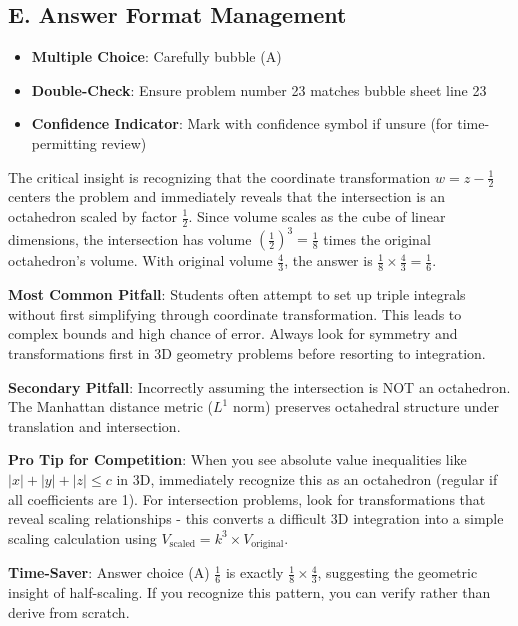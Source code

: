 \documentclass[11pt]{article}
\begin{document}
\begin{competitionbox}
\subsection*{E. Answer Format Management}
\begin{itemize}[leftmargin=*]
    \item \textbf{Multiple Choice}: Carefully bubble (A)
    \item \textbf{Double-Check}: Ensure problem number 23 matches bubble sheet line 23
    \item \textbf{Confidence Indicator}: Mark with confidence symbol if unsure (for time-permitting review)
\end{itemize}
\end{competitionbox}

\begin{keyinsightbox}
The critical insight is recognizing that the coordinate transformation $w = z - \frac{1}{2}$ centers the problem and immediately reveals that the intersection is an octahedron scaled by factor $\frac{1}{2}$. Since volume scales as the cube of linear dimensions, the intersection has volume $(\frac{1}{2})^3 = \frac{1}{8}$ times the original octahedron's volume. With original volume $\frac{4}{3}$, the answer is $\frac{1}{8} \times \frac{4}{3} = \frac{1}{6}$.
\end{keyinsightbox}

\begin{warningbox}
\textbf{Most Common Pitfall}: Students often attempt to set up triple integrals without first simplifying through coordinate transformation. This leads to complex bounds and high chance of error. Always look for symmetry and transformations first in 3D geometry problems before resorting to integration.

\textbf{Secondary Pitfall}: Incorrectly assuming the intersection is NOT an octahedron. The Manhattan distance metric ($L^1$ norm) preserves octahedral structure under translation and intersection.
\end{warningbox}

\begin{tipbox}
\textbf{Pro Tip for Competition}: When you see absolute value inequalities like $|x|+|y|+|z|\le c$ in 3D, immediately recognize this as an octahedron (regular if all coefficients are 1). For intersection problems, look for transformations that reveal scaling relationships - this converts a difficult 3D integration into a simple scaling calculation using $V_{\text{scaled}} = k^3 \times V_{\text{original}}$.

\textbf{Time-Saver}: Answer choice (A) $\frac{1}{6}$ is exactly $\frac{1}{8} \times \frac{4}{3}$, suggesting the geometric insight of half-scaling. If you recognize this pattern, you can verify rather than derive from scratch.
\end{tipbox}
\end{document}
